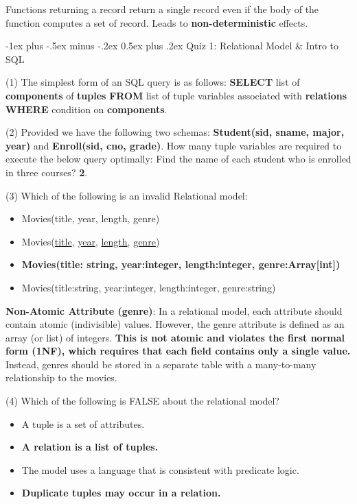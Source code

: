 \documentclass[10pt,landscape]{article}
\makeatletter
\newcommand{\prpt}[1]{{\color{red} \textbf{#1}}}
\newcommand{\sql}[1]{{\color{cyan} \textbf{#1}}}
\newcommand{\ans}[1]{{\color{purple} \textbf{#1}}}
\renewcommand{\section}{\@startsection{section}{1}{0mm}%
                                {-1ex plus -.5ex minus -.2ex}%
                                {0.5ex plus .2ex}%
                                {\normalfont\large\bfseries}}
\makeatother
\begin{document}
\begin{multicols}{4}
Functions returning a record return a single record even if the body of the function computes a set of record. Leads to \prpt{non-deterministic} effects.

\section{Quiz 1: Relational Model \& Intro to SQL}

(1) The simplest form of an SQL query is as follows:
\sql{SELECT} list of \ans{components} of \ans{tuples}
\sql{FROM} list of tuple variables associated with \ans{relations}
\sql{WHERE} condition on \ans{components}.

(2) Provided we have the following two schemas: \sql{Student(sid, sname, major, year)} and \sql{Enroll(sid, cno, grade)}. How many tuple variables are required to execute the below query optimally: Find the name of each student who is enrolled in three courses? \ans{2}.

(3) Which of the following is an invalid Relational model:

\begin{itemize}
	\item Movies(title, year, length, genre)
	\item Movies(\underline{title}, \underline{year}, \underline{length}, \underline{genre})
	\item \ans{Movies(title: string, year:integer, length:integer, genre:Array[int])}
	\item Movies(title:string, year:integer, length:integer, genre:string)
\end{itemize}

\textbf{Non-Atomic Attribute (genre)}: In a relational model, each attribute should contain atomic (indivisible) values. However, the genre attribute is defined as an array (or list) of integers. \prpt{This is not atomic and violates the first normal form (1NF), which requires that each field contains only a single value.} Instead, genres should be stored in a separate table with a many-to-many relationship to the movies.

(4) Which of the following is FALSE about the relational model?

\begin{itemize}
	\item A tuple is a set of attributes.
	\item \ans{A relation is a list of tuples.}
	\item The model uses a language that is consistent with predicate logic.
	\item \ans{Duplicate tuples may occur in a relation.}
\end{itemize}
 

\end{multicols}
\end{document}

